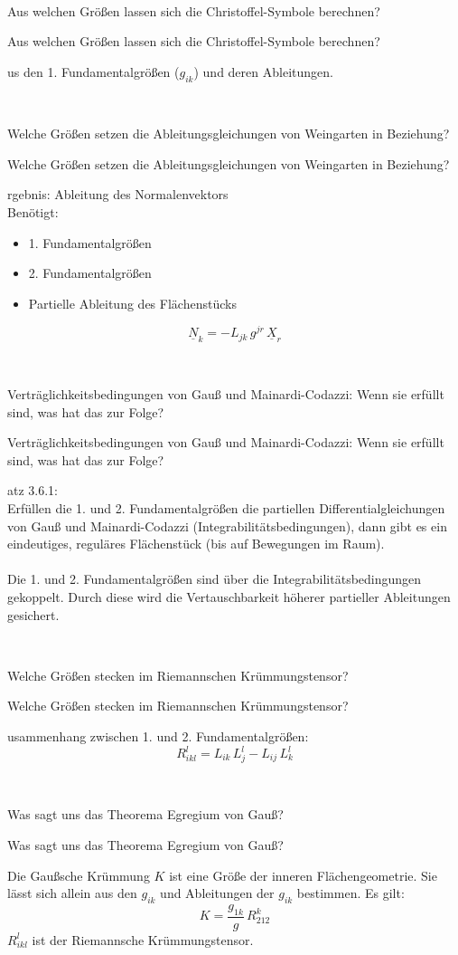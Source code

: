 \documentclass[DIV=1]{scrartcl}
\newcommand{\frage}[3][10]{
    \newpage
    \
    \vspace{#1 em}
    \begin{framed}
        #2
    \end{framed}
    \newpage
    \begin{framed}
        #2
    \end{framed}
    \vspace{2 em}
}
\begin{document}
\frage{Aus welchen Größen lassen sich die Christoffel-Symbole berechnen?}

Aus den 1. Fundamentalgrößen ($g_{ik}$) und deren Ableitungen.



\frage{Welche Größen setzen die Ableitungsgleichungen von Weingarten in Beziehung?}

Ergebnis: Ableitung des Normalenvektors\\
Benötigt:
\begin{itemize}
    \item 1. Fundamentalgrößen
    \item 2. Fundamentalgrößen
    \item Partielle Ableitung des Flächenstücks
\end{itemize}
\[
    \underline{N}_k = - L_{jk} \, g^{jr} \, \underline{X}_r
\]



\frage{Verträglichkeitsbedingungen von Gauß und Mainardi-Codazzi: Wenn sie erfüllt sind, was hat das zur Folge?}

Satz 3.6.1:\\
Erfüllen die 1. und 2. Fundamentalgrößen die partiellen Differentialgleichungen von Gauß und Mainardi-Codazzi (Integrabilitätsbedingungen), dann gibt es ein eindeutiges, reguläres Flächenstück (bis auf Bewegungen im Raum).\\
\\
Die 1. und 2. Fundamentalgrößen sind über die Integrabilitätsbedingungen gekoppelt. Durch diese wird die Vertauschbarkeit höherer partieller Ableitungen gesichert.



\frage{Welche Größen stecken im Riemannschen Krümmungstensor?}

Zusammenhang zwischen 1. und 2. Fundamentalgrößen:
\[
    R_{ikl}^l = L_{ik} \, L_j^l - L_{ij} \, L_k^l
\]



\frage{Was sagt uns das Theorema Egregium von Gauß?}

\textit{Die Gaußsche Krümmung $K$ ist eine Größe der inneren Flächen\-geometrie. Sie lässt sich allein aus den $g_{ik}$ und Ableitungen der $g_{ik}$ bestimmen. Es gilt:}
\[
    K = \frac{g_{1k}}{g} \, R_{212}^k
\]
$R_{ikl}^l$ ist der Riemannsche Krümmungstensor.
\end{document}
